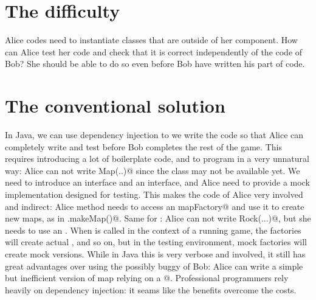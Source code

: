 \documentclass[submission,copyright,creativecommons]{eptcs}
\begin{document}
\section{The difficulty}

Alice codes need to instantiate classes that are outside of her component.
How can Alice test her code and check that it is correct independently 
of the code of Bob? She should be able to do so even before Bob have written
his part of code.




\section{The conventional solution}
In Java, we can use dependency injection to we write the code so that Alice can 
completely write and test \Q@load@ before
Bob completes the rest of the game.
This requires introducing a lot of boilerplate code, and 
to program in a very unnatural way:
Alice can not write \Q@new Map(..)@
since the \Q@Map@ class may not be available yet.
We need to introduce an \Q@IMap@ interface and an \Q@IMapFactory@ interface,
and Alice need to provide
a mock implementation designed for testing.
This makes the code of Alice very involved and indirect:
Alice \Q@load@ method needs to access an \Q@IMapFactory mapFactory@
and use it to create new maps, as in \Q@mapFactory.makeMap()@.
Same for \Q@Item@s: Alice can not write \Q@new Rock(...)@,
but she needs to use an \Q@IItemFactory@.
When \Q@load@ is called in the context of a running game,
the factories will create actual \Q@Map@s, \Q@Rock@s
and so on, but in the testing environment, 
mock factories will create mock versions.
While in Java this is very verbose and involved,
it still has great advantages over using the
possibly buggy \Q@Map@ of Bob: Alice can 
write a simple but inefficient version of map relying
on a @.
Professional programmers rely heavily on dependency
injection: it seams like the benefits overcome the costs.
\end{document}
